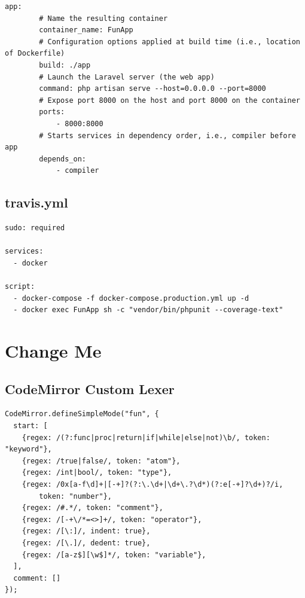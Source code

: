 \documentclass{l4proj}
\begin{document}
\begin{appendices}
\begin{lstlisting}[language=config]
    app:
        # Name the resulting container
        container_name: FunApp
        # Configuration options applied at build time (i.e., location of Dockerfile)
        build: ./app
        # Launch the Laravel server (the web app)
        command: php artisan serve --host=0.0.0.0 --port=8000
        # Expose port 8000 on the host and port 8000 on the container
        ports:
            - 8000:8000
        # Starts services in dependency order, i.e., compiler before app
        depends_on:
            - compiler
\end{lstlisting}

\section{travis.yml}
\label{sec:travis}
\begin{lstlisting}[language=config]
sudo: required

services:
  - docker

script:
  - docker-compose -f docker-compose.production.yml up -d
  - docker exec FunApp sh -c "vendor/bin/phpunit --coverage-text"
\end{lstlisting}

\chapter{Change Me}
\section{CodeMirror Custom Lexer}
\label{sec:custom-lexer}
\begin{lstlisting}[language=config]
CodeMirror.defineSimpleMode("fun", {
  start: [
    {regex: /(?:func|proc|return|if|while|else|not)\b/, token: "keyword"},
    {regex: /true|false/, token: "atom"},
    {regex: /int|bool/, token: "type"},
    {regex: /0x[a-f\d]+|[-+]?(?:\.\d+|\d+\.?\d*)(?:e[-+]?\d+)?/i,
        token: "number"},
    {regex: /#.*/, token: "comment"},
    {regex: /[-+\/*=<>]+/, token: "operator"},
    {regex: /[\:]/, indent: true},
    {regex: /[\.]/, dedent: true},
    {regex: /[a-z$][\w$]*/, token: "variable"},
  ],
  comment: []
});
\end{lstlisting}

\end{appendices}




\end{document}
